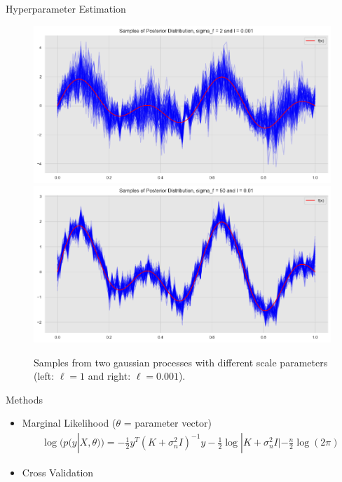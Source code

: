 \documentclass[10pt]{beamer}
\begin{document}
\begin{frame}{Hyperparameter Estimation}{\cite[Chapter 2.3, 5]{RW05}}
\begin{center}
\begin{figure}
\includegraphics[scale=0.21]{images/gaussian_process_regression_files/gaussian_process_regression_68_0.png}
\includegraphics[scale=0.21]{images/gaussian_process_regression_files/gaussian_process_regression_72_0.png}
\caption{Samples from two gaussian processes with different scale parameters (left: $\ell=1$ and right: $\ell = 0.001$).}
\end{figure}
\end{center}
\begin{block}{Methods}
\begin{itemize}
\item Marginal Likelihood ($\theta$ = parameter vector)
\begin{align*}
\log(p(y|X, \theta)) = -\frac{1}{2}y^T (K+\sigma_n^2I)^{-1}y - \frac{1}{2}\log|K+\sigma_n^2I| - \frac{n}{2}\log (2\pi)
\end{align*}
\item Cross Validation
\end{itemize}
\end{block}
\end{frame}
\end{document}
